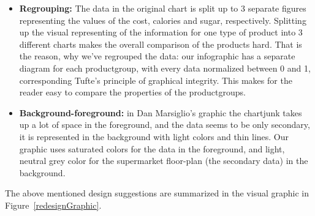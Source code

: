 \begin{itemize}
	\item \textbf{Regrouping:} The data in the original chart is split up to 3
		separate figures representing the values of the cost, calories and sugar,
		respectively. Splitting up the visual representing of the information for
		one type of product into 3 different charts makes the overall comparison of
		the products hard. That is the reason, why we've regrouped the data: our
		infographic has a separate  diagram for each productgroup, with every data
		normalized between 0 and 1, corresponding Tufte's principle of graphical
		integrity. This makes for the reader easy to compare the properties of the
		productgroups.

	\item \textbf{Background-foreground:} in Dan Marsiglio's graphic the chartjunk
		takes up a lot of space in the foreground, and the data seems to be only
		secondary, it is represented in the background with light colors and thin
		lines. Our graphic uses saturated colors for the data in the foreground, and
		light, neutral grey color for the supermarket floor-plan (the secondary
		data) in the background.
		
\end{itemize}

The above mentioned design suggestions are summarized in the visual graphic in Figure~\ref{redesignGraphic}.
